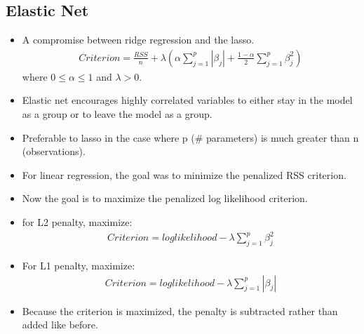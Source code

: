 \documentclass[12pt, oneside]{article}
\begin{document}
\subsection{Elastic Net}
\begin{itemize}
    \item A compromise between ridge regression and the lasso. 
     \begin{align*}
        Criterion = \frac{RSS}{n} + \lambda(\alpha\sum^p_{j=1}|\beta_j| + \frac{1 - \alpha}{2}\sum^p_{j=1}\beta_j^2)
    \end{align*}
    where $0 \leq \alpha \leq 1$ and $\lambda > 0$.
    \item Elastic net encourages highly correlated variables to either stay in the model as a group or to leave the model as a group. 
    \item Preferable to lasso in the case where p ($\#$ parameters) is much greater than n (observations). 
\end{itemize}

\begin{itemize}
    \item For linear regression, the goal was to minimize the penalized RSS criterion.
    \item Now the goal is to maximize the penalized log likelihood criterion.
    \item for L2 penalty, maximize:
    \begin{align*}
    Criterion = loglikelihood - \lambda\sum^p_{j=1}\beta^2_j
    \end{align*}
    \item For L1 penalty, maximize:
    \begin{align*}
        Criterion = loglikelihood - \lambda\sum^p_{j=1}|\beta_j|
    \end{align*}
    \item Because the criterion is maximized, the penalty is subtracted rather than added like before. 
\end{itemize}
\end{document}
